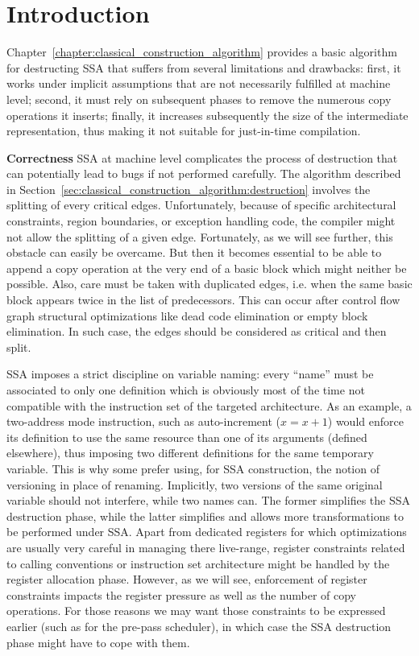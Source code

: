 \section{Introduction}
Chapter~\ref{chapter:classical_construction_algorithm} provides a basic algorithm for destructing SSA that suffers from several limitations and drawbacks: first, it works under implicit assumptions that are not necessarily fulfilled at machine level; second, it must rely on subsequent phases to remove the numerous copy operations it inserts; finally, it increases subsequently the size of the intermediate representation, thus making it not suitable for just-in-time compilation.   

{\bf Correctness}
SSA at machine level complicates the process of destruction that can potentially lead to bugs if not performed carefully. The algorithm described in Section~\ref{sec:classical_construction_algorithm:destruction} involves the splitting of every critical edges. Unfortunately, because of specific architectural constraints, region boundaries, or exception handling code, the compiler might not allow the splitting of a given edge. Fortunately, as we will see further, this obstacle can easily be overcame. But then it becomes essential to be able to append a copy operation at the very end of a basic block which might neither be possible. Also, care must be taken with duplicated edges, i.e. when the same basic block appears twice in the list of predecessors.
This can occur after control flow graph structural optimizations like
dead code elimination or empty block elimination.
In such case, the edges should be considered as critical and then split.

SSA imposes a strict discipline on variable naming: every ``name'' must be associated to only one definition which is obviously most of the time not compatible with the instruction set of the targeted architecture. As an example, a two-address mode instruction, such as auto-increment ($x=x+1$) would enforce its definition to use the same resource than one of its arguments (defined elsewhere), thus imposing two different definitions for the same temporary variable. This is why some prefer using, for SSA construction, the notion of versioning in place of renaming. Implicitly, two versions of the same original variable should not interfere, while two names can. The former simplifies the SSA destruction phase, while the latter simplifies and allows more transformations to be performed under SSA. Apart from dedicated registers for which optimizations are usually very careful in managing there live-range, register constraints related to calling conventions or instruction set architecture might be handled by the register allocation phase. However, as we will see, enforcement of register constraints impacts the register pressure as well as the number of copy operations. For those reasons we may want those constraints to be expressed earlier (such as for the pre-pass scheduler), in which case the SSA destruction phase might have to cope with them.

